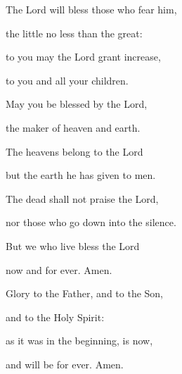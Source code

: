 \noindent The Lord will bless those who fear him,~\GreStar{}~\nopagebreak

the little no less than the great:

\noindent to you may the Lord grant increase,~\GreStar{}~\nopagebreak

to you and all your children.



\noindent May you be blessed by the Lord,~\GreStar{}~\nopagebreak

the maker of heaven and earth.

\noindent The heavens belong to the Lord~\GreStar{}~\nopagebreak

but the earth he has given to men.



\noindent The dead shall not praise the Lord,~\GreStar{}~\nopagebreak

nor those who go down into the silence.

\noindent But we who live bless the Lord~\GreStar{}~\nopagebreak

now and for ever. Amen.



\noindent Glory to the Father, and to the Son,~\GreStar{}~\nopagebreak

and to the Holy Spirit:

\noindent as it was in the beginning, is now,~\GreStar{}~\nopagebreak

and will be for ever. Amen.
